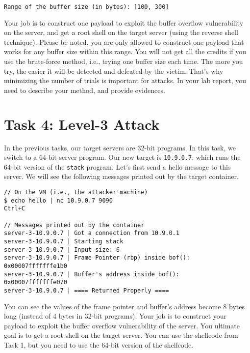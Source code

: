 \begin{lstlisting}
Range of the buffer size (in bytes): [100, 300]
\end{lstlisting}
 

Your job is to construct one payload to exploit the buffer overflow
vulnerability on the server, and get a root shell on the target server (using
the reverse shell technique). Please be noted, you are only allowed 
to construct one payload that works for any buffer size 
within this range.  You will not get all the credits if you 
use the brute-force method, i.e., trying one buffer size
each time. The more you try, the easier it will be detected 
and defeated by the victim. That's why minimizing the number 
of trials is important for attacks. 
In your lab report, you need to describe your method, 
and provide evidences.



\section{Task 4: Level-3 Attack} 

In the previous tasks, our target servers are 32-bit 
programs. In this task, we switch to a 64-bit server 
program.  Our new target is \texttt{10.9.0.7}, which 
runs the 64-bit version of the \texttt{stack} program.  
Let's first send a hello message to this server. 
We will see the following messages printed out by the target container. 

\begin{lstlisting}
// On the VM (i.e., the attacker machine)
$ echo hello | nc 10.9.0.7 9090
Ctrl+C

// Messages printed out by the container
server-3-10.9.0.7 | Got a connection from 10.9.0.1
server-3-10.9.0.7 | Starting stack
server-3-10.9.0.7 | Input size: 6
server-3-10.9.0.7 | Frame Pointer (rbp) inside bof():  0x00007fffffffe1b0
server-3-10.9.0.7 | Buffer's address inside bof():     0x00007fffffffe070
server-3-10.9.0.7 | ==== Returned Properly ====
\end{lstlisting}

You can see the values of the frame pointer and buffer's address
become 8 bytes long (instead of 4 bytes in 32-bit programs).
Your job is to construct your payload to exploit the buffer overflow
vulnerability of the server. 
You ultimate goal is to get a root shell on 
the target server. You can use the shellcode from Task 1, but 
you need to use the 64-bit version of the shellcode. 


